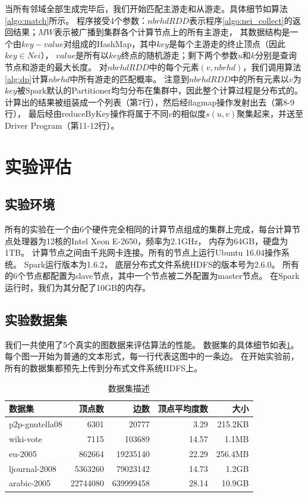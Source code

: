 \documentclass[master]{njuthesis}
\begin{document}
当所有邻域全部生成完毕后，我们开始匹配主游走和从游走。具体细节如算法\ref{algo:match}所示。
程序接受4个参数：$nbrhdRDD$表示程序\ref{algo:nei_collect}的返回结果；$MW$表示被广播到集群各个计算节点上的所有主游走，
其数据结构是一个由$key-value$对组成的HashMap，其中$key$是每个主游走的终止顶点（因此$key \in Nei$），
$value$是所有以$key$终点的随机游走；剩下两个参数$u$和$k$分别是查询节点和游走的最大长度。
对$nbrhdRDD$中的每个元素$(v,nbrhd)$，我们调用算法\ref{alg:dp}计算$nbrhd$中所有游走的匹配概率。
注意到$nbrhdRDD$中的所有元素以$v$为$key$被Spark默认的Partitioner均匀分布在集群中，因此整个计算过程是分布式的。
计算出的结果被组装成一个列表（第7行），然后经flagmap操作发射出去（第8-9行），
最后经由reduceByKey操作将属于不同$v$的相似度$s(u,v)$聚集起来，并送至Driver Program（第11-12行）。
\section{实验评估}
\subsection{实验环境}
所有的实验在一个由6个硬件完全相同的计算节点组成的集群上完成，每台计算节点处理器为12核的Intel Xeon E-2650，频率为2.1GHz，
内存为64GB，硬盘为1TB。 计算节点之间由千兆网卡连接。所有的节点上运行Ubuntu 16.04操作系统。 
Spark运行版本为1.6.2， 底层分布式文件系统HDFS的版本号为2.6.0。
所有的6个节点都配置为slave节点，其中一个节点被二外配置为master节点。 
在Spark运行时，我们为其分配了10GB的内存。
\subsection{实验数据集}
我们一共使用了5个真实的图数据来评估算法的性能。 数据集的具体细节如表\ref{tab:dataset1}。
每个图一开始为普通的文本形式，每一行代表这图中的一条边。
在开始实验前，所有的数据集都预先上传到分布式文件系统HDFS上。
\begin{table}[h]
\caption{数据集描述}
\label{tab:dataset1}
\centering
\begin{tabular}{|l|r|r|r|r|}
\hline
\textbf{数据集} & \textbf{顶点数} & \textbf{边数} & \textbf{顶点平均度数} & \textbf{大小} \\
\hline
p2p-gnutella08 \footnotemark[1]  & {6301}         & \num{20777}                   & 3.29                & 215.2KB\\
\hline
wiki-vote \footnotemark[2]    & 7115 	& \num{103689}                           &14.57                & 1.1MB  \\
\hline
eu-2005       \footnotemark[3]     & \num{862664}  & \num{19235140 }          & 22.29             & 256.4MB\\
\hline
ljournal-2008  \footnotemark[4] & \num{5363260} & \num{79023142}         & 14.73            &1.2GB\\
\hline
arabic-2005 \footnotemark[5]   & \num{22744080} & \num{639999458}      & 28.14           & 10.9GB\\
\hline
\end{tabular}
\end{table}
\end{document}
